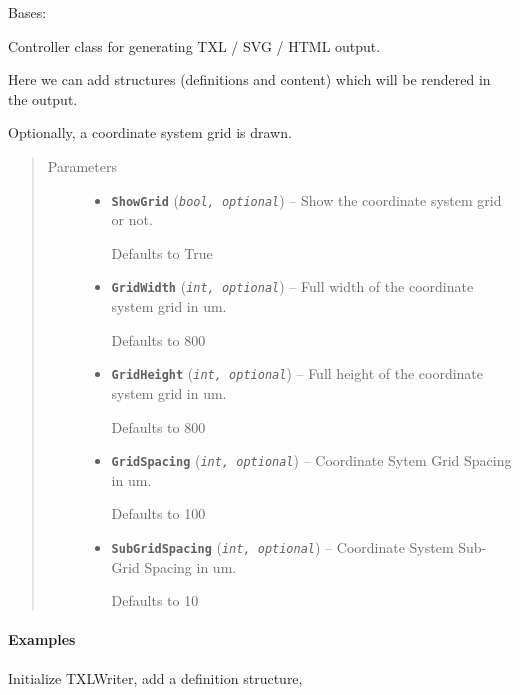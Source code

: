 \documentclass[letterpaper,10pt,english]{sphinxmanual}
\begin{document}
\begin{fulllineitems}
\label{Chapters/PythonModuleReference/TXLWriter/TXLWizard.TXLWriter:TXLWizard.TXLWriter.TXLWriter}
Bases: 

Controller class for generating TXL / SVG / HTML output.

Here we can add structures (definitions and content) which will be rendered in the output.

Optionally, a coordinate system grid is drawn.
\begin{quote}\begin{description}
\item[{Parameters}] \leavevmode\begin{itemize}
\item {} 
\textbf{\texttt{ShowGrid}} (\emph{\texttt{bool, optional}}) -- 
Show the coordinate system grid or not.

Defaults to True


\item {} 
\textbf{\texttt{GridWidth}} (\emph{\texttt{int, optional}}) -- 
Full width of the coordinate system grid in um.

Defaults to 800


\item {} 
\textbf{\texttt{GridHeight}} (\emph{\texttt{int, optional}}) -- 
Full height of the coordinate system grid in um.

Defaults to 800


\item {} 
\textbf{\texttt{GridSpacing}} (\emph{\texttt{int, optional}}) -- 
Coordinate Sytem Grid Spacing in um.

Defaults to 100


\item {} 
\textbf{\texttt{SubGridSpacing}} (\emph{\texttt{int, optional}}) -- 
Coordinate System Sub-Grid Spacing in um.

Defaults to 10


\end{itemize}

\end{description}\end{quote}
\paragraph{Examples}

Initialize TXLWriter, add a definition structure,


\end{fulllineitems}
\end{document}
